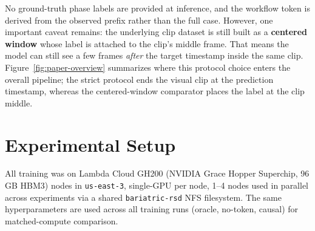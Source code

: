 No ground-truth phase labels are provided at inference, and the
workflow token is derived from the observed prefix rather than the full
case. However, one important caveat remains: the underlying clip dataset
is still built as a \textbf{centered window} whose label is attached to
the clip's middle frame. That means the model can still see a few frames
\emph{after} the target timestamp inside the same clip.
Figure~\ref{fig:paper-overview} summarizes where this protocol choice
enters the overall pipeline; the strict protocol ends the visual clip at
the prediction timestamp, whereas the centered-window comparator places
the label at the clip middle.

\section{Experimental Setup}\label{experimental-setup}

All training was on Lambda Cloud GH200 (NVIDIA Grace Hopper Superchip,
96 GB HBM3) nodes in \texttt{us-east-3}, single-GPU per node, 1--4 nodes
used in parallel across experiments via a shared \texttt{bariatric-rsd}
NFS filesystem. The same hyperparameters are used across all training
runs (oracle, no-token, causal) for matched-compute comparison.

